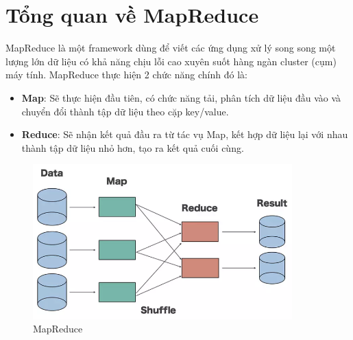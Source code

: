 \pagebreak
\section{Tổng quan về MapReduce}
MapReduce là một framework dùng để viết các ứng dụng xử lý song song
một lượng lớn dữ liệu có khả năng chịu lỗi cao xuyên suốt hàng ngàn
cluster (cụm) máy tính.
\vspace{0.5cm}
\newline
MapReduce thực hiện 2 chức năng chính đó là:
\begin{itemize}
    \item \textbf{Map}: Sẽ thực hiện đầu tiên, có chức năng tải,
          phân tích dữ liệu đầu vào và chuyển đổi thành tập
          dữ liệu theo cặp key/value.
    \item \textbf{Reduce}: Sẽ nhận kết quả đầu ra từ tác vụ Map,
          kết hợp dữ liệu lại với nhau thành tập dữ liệu nhỏ hơn, tạo ra
          kết quả cuối cùng.
\end{itemize}
\begin{figure}[ht]
    \centering
    \includegraphics[width=10cm]{images/MapReduce.png}
    \caption{MapReduce}
\end{figure}